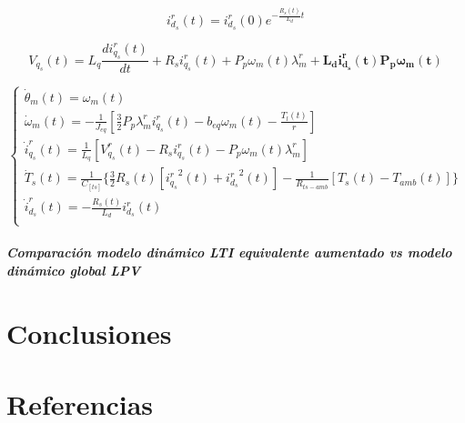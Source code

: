 \documentclass{article}
\begin{document}
\begin{enumerate}[label=\roman*.]
    \begin{equation}
        i_{d_{s}}^r(t) = i_{d_{s}}^r(0)e^{-\frac{R_{s}(t)}{L_{d}}t}
    \end{equation}

    \begin{equation}
        V_{q_{s}}(t) = L_{q}\frac{di_{q_{s}}^r(t)}{dt} + R_{s}i_{q_{s}}^r(t) + P_{p}\omega_{m}(t)\lambda_{m}^r + \mathbf{L_{d}i_{d_{s}}^r(t)P_{p}\omega_{m}(t)}
    \end{equation}

    \begin{equation}
        \begin{cases}
            \dot{\theta}_{m}(t) = \omega_{m}(t)\\
            \dot{\omega}_{m}(t) = -\frac{1}{J_{eq}}[\frac{3}{2}P_{p}\lambda_{m}^r i_{q_{s}}^r(t) - b_{eq}\omega_{m}(t)-\frac{T_{l}(t)}{r}]\\
            \dot{i}_{q_{s}}^r(t) = \frac{1}{L_{q}}[V_{q_{s}}^r(t) - R_{s}i_{q_{s}}^r(t) - P_{p}\omega_{m}(t)\lambda_{m}^r]\\
            \dot{T}_{s}(t) = \frac{1}{C_[ts]}\{\frac{3}{2}R_{s}(t)[{i_{q_{s}}^r}^2(t) + {i_{d_{s}}^r}^2(t)] - \frac{1}{R_{ts-amb}}[T_{s}(t) - T_{amb}(t)]\}\\
            \dot{i}_{d_{s}}^r(t) = -\frac{R_{s}(t)}{L_{d}}i_{d_{s}}^r(t) \\
        \end{cases}    
    \end{equation}

\end{enumerate}


\subsubsection*{Comparación modelo dinámico LTI equivalente aumentado vs modelo dinámico global LPV}

\newpage
\part*{Conclusiones}

\newpage
\part*{Referencias}
\lipsum{}
\label{LastPage}    
\end{document}
